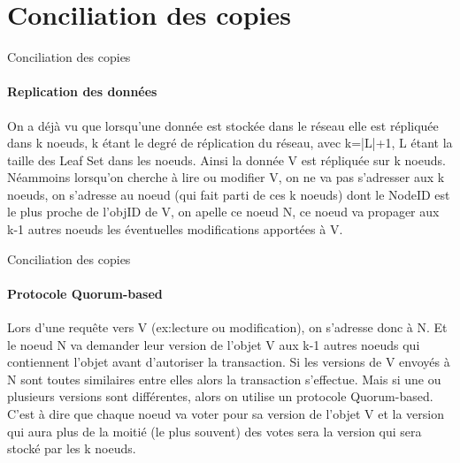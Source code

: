 \documentclass[french]{beamer}
\begin{document}
\section{Conciliation des copies}
\begin{frame}{Conciliation des copies}
\framesubtitle{Replication des données}
On a déjà vu que lorsqu'une donnée est stockée dans le réseau elle est répliquée dans k noeuds, k étant le degré de réplication du réseau, avec k=|L|+1, L étant la taille des Leaf Set dans les noeuds. Ainsi la donnée V est répliquée sur k noeuds. Néammoins lorsqu'on cherche à lire ou modifier V, on ne va pas s'adresser aux k noeuds, on s'adresse au noeud (qui fait parti de ces k noeuds) dont le NodeID est le plus proche de l'objID de V, on apelle ce noeud N, ce noeud va propager aux k-1 autres noeuds les éventuelles modifications apportées à V.\\

\end{frame}
\begin{frame}{Conciliation des copies}
\framesubtitle{Protocole Quorum-based}
Lors d'une requête vers V (ex:lecture ou modification), on s'adresse donc à N. Et le noeud N va demander leur version de l'objet V aux k-1 autres noeuds qui contiennent l'objet avant d'autoriser la transaction. Si les versions de V envoyés à N sont toutes similaires entre elles alors la transaction s'effectue. Mais si une ou plusieurs versions sont différentes, alors on utilise un protocole Quorum-based.\\C'est à dire que chaque noeud va voter pour sa version de l'objet V et la version qui aura plus de la moitié (le plus souvent) des votes sera la version qui sera stocké par les k noeuds.
\end{frame}
\end{document}
